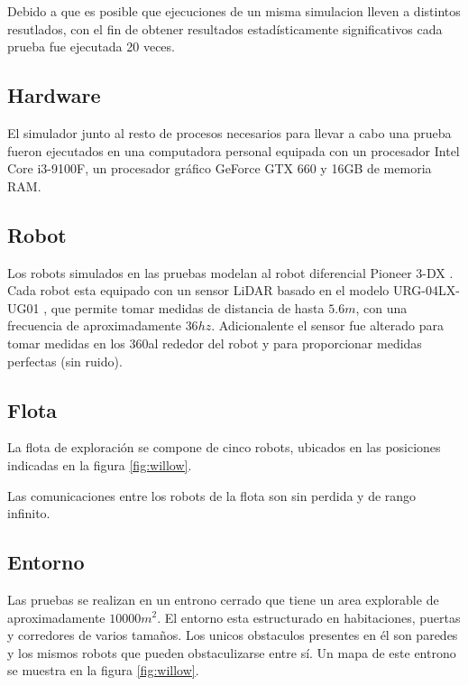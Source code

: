 Debido a que es posible que ejecuciones de un misma simulacion lleven a
distintos resutlados, con el fin de obtener resultados estadísticamente
significativos cada prueba fue ejecutada 20 veces.

\subsection{Hardware}
El simulador junto al resto de procesos necesarios para llevar a cabo una
prueba fueron ejecutados en una computadora personal equipada con un procesador
Intel Core i3-9100F, un procesador gráfico GeForce GTX 660 y 16GB de memoria
RAM.

\subsection{Robot}
Los robots simulados en las pruebas modelan al robot diferencial Pioneer 3-DX
\cite{p3dx}. Cada robot esta equipado con un sensor LiDAR basado en el modelo
URG-04LX-UG01 \cite{hokuyo}, que permite tomar medidas de distancia de hasta
$5.6m$, con una frecuencia de aproximadamente $36hz$. Adicionalente el sensor
fue alterado para tomar medidas en los $360$\textdegree al rededor del robot y
para proporcionar medidas perfectas (sin ruido).

\subsection{Flota}

La flota de exploración se compone de cinco robots, ubicados en las posiciones
indicadas en la figura \ref{fig:willow}.%

Las comunicaciones entre los robots de la flota son sin perdida y de rango
infinito.

\subsection{Entorno}
Las pruebas se realizan en un entrono cerrado que tiene un area explorable de
aproximadamente $10000m^2$. El entorno esta estructurado en habitaciones,
puertas y corredores de varios tamaños. Los unicos obstaculos presentes en él
son paredes y los mismos robots que pueden obstaculizarse entre
sí. Un mapa de este entrono se muestra en la figura
\ref{fig:willow}.

